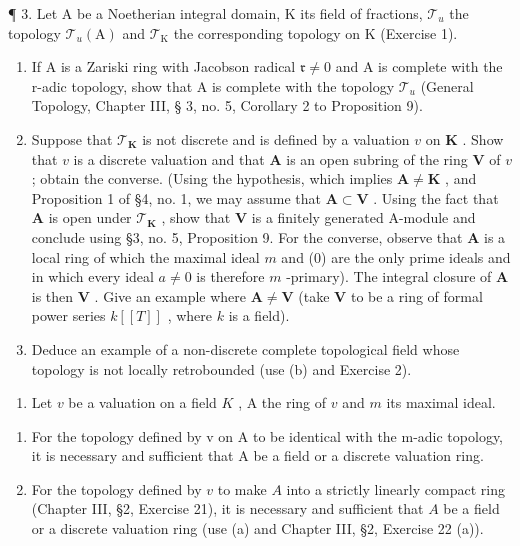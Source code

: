 ¶ 3. Let A be a Noetherian integral domain, K its field of fractions, \(\mathcal{T}_{u}\) the topology \(\mathcal{T}_{u}(\mathrm{A})\) and \(\mathcal{T}_{\mathrm{K}}\) the corresponding topology on K (Exercise 1).

\begin{enumerate}
\def\labelenumi{(\alph{enumi})}
\item
  If A is a Zariski ring with Jacobson radical \(\mathfrak{r} \neq 0\) and A is complete with the r-adic topology, show that A is complete with the topology \(\mathcal{T}_u\) (General Topology, Chapter III, § 3, no. 5, Corollary 2 to Proposition 9).
\item
  Suppose that \(\mathcal{T}_{\mathbf{K}}\) is not discrete and is defined by a valuation \(v\) on \(\mathbf{K}\) . Show that \(v\) is a discrete valuation and that \(\mathbf{A}\) is an open subring of the ring \(\mathbf{V}\) of \(v\) ; obtain the converse. (Using the hypothesis, which implies \(\mathbf{A} \neq \mathbf{K}\) , and Proposition 1 of §4, no. 1, we may assume that \(\mathbf{A} \subset \mathbf{V}\) . Using the fact that \(\mathbf{A}\) is open under \(\mathcal{T}_{\mathbf{K}}\) , show that \(\mathbf{V}\) is a finitely generated A-module and conclude using §3, no. 5, Proposition 9. For the converse, observe that \(\mathbf{A}\) is a local ring of which the maximal ideal \(m\) and (0) are the only prime ideals and in which every ideal \(a \neq 0\) is therefore \(m\) -primary). The integral closure of \(\mathbf{A}\) is then \(\mathbf{V}\) . Give an example where \(\mathbf{A} \neq \mathbf{V}\) (take \(\mathbf{V}\) to be a ring of formal power series \(k[[T]]\) , where \(k\) is a field).
\item
  Deduce an example of a non-discrete complete topological field whose topology is not locally retrobounded (use (b) and Exercise 2).
\end{enumerate}

\begin{enumerate}
\def\labelenumi{\arabic{enumi}.}
\setcounter{enumi}{3}
\tightlist
\item
  Let \(v\) be a valuation on a field \(K\) , A the ring of \(v\) and \(m\) its maximal ideal.
\end{enumerate}

\begin{enumerate}
\def\labelenumi{(\alph{enumi})}
\item
  For the topology defined by v on A to be identical with the m-adic topology, it is necessary and sufficient that A be a field or a discrete valuation ring.
\item
  For the topology defined by \(v\) to make \(A\) into a strictly linearly compact ring (Chapter III, §2, Exercise 21), it is necessary and sufficient that \(A\) be a field or a discrete valuation ring (use (a) and Chapter III, §2, Exercise 22 (a)).
\end{enumerate}

